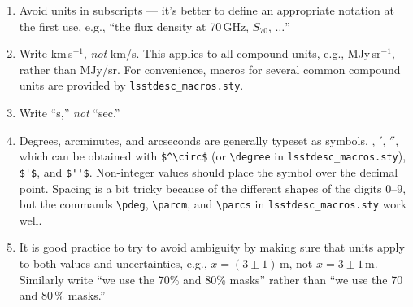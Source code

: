 \documentclass[letterpaper,11pt]{article}
\begin{document}
\begin{enumerate}
\item Avoid units in subscripts --- it's better to define an appropriate
notation at the first use, e.g., ``the flux density at 70\,GHz,
$S_{70}$, $\ldots$''

\item Write km\,s$^{-1}$, {\it not\/} km/s.  This applies to all compound
units, e.g., MJy\,sr$^{-1}$, rather than MJy/sr. For convenience, macros for several common compound units are provided by {\tt lsstdesc\_macros.sty}.

\item Write ``s,'' {\it not\/} ``sec.''


\item Degrees, arcminutes, and arcseconds are generally typeset as symbols,
\degree, $'$, $''$, which can be obtained with \verb|$^\circ$| (or \verb|\degree| in {\tt lsstdesc\_macros.sty}), \verb|$'$|, and \verb|$''$|. Non-integer values should place the symbol over the
decimal point.  Spacing is a bit tricky because of the different shapes of the
digits 0--9, but the commands \verb|\pdeg|, \verb|\parcm|, and \verb|\parcs| in {\tt lsstdesc\_macros.sty}
work well.  



\item It is good practice to try to avoid ambiguity by making sure that units
apply to both values and uncertainties, e.g., $x=(3\pm1)\,$m, not $x=3\pm1\,$m.
 Similarly write ``we use the 70\% and 80\% masks'' rather than ``we use
the 70 and 80\,\% masks.''


\end{enumerate}
\end{document}
